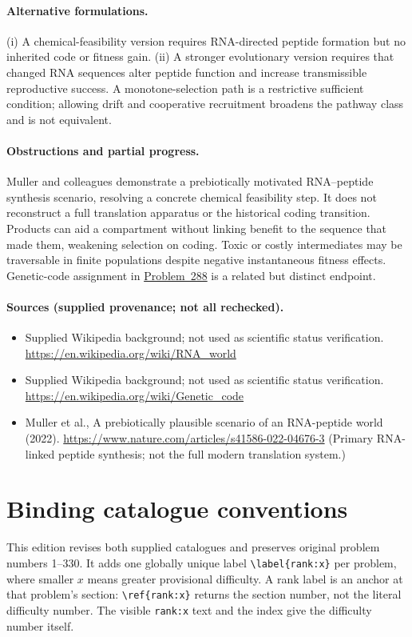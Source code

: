 \documentclass[11pt]{article}
\begin{document}
\paragraph{Alternative formulations.} (i) A chemical-feasibility version requires RNA-directed peptide formation but no inherited code or fitness gain. (ii) A stronger evolutionary version requires that changed RNA sequences alter peptide function and increase transmissible reproductive success. A monotone-selection path is a restrictive sufficient condition; allowing drift and cooperative recruitment broadens the pathway class and is not equivalent.

\paragraph{Obstructions and partial progress.} Muller and colleagues demonstrate a prebiotically motivated RNA--peptide synthesis scenario, resolving a concrete chemical feasibility step. It does not reconstruct a full translation apparatus or the historical coding transition. Products can aid a compartment without linking benefit to the sequence that made them, weakening selection on coding. Toxic or costly intermediates may be traversable in finite populations despite negative instantaneous fitness effects. Genetic-code assignment in \href{https://we-solve.github.io/problems/origin-of-the-genetic-code-6b6e4991/}{Problem~288} is a related but distinct endpoint.

\paragraph{Sources (supplied provenance; not all rechecked).} \begin{itemize}
\item Supplied Wikipedia background; not used as scientific status verification. \url{https://en.wikipedia.org/wiki/RNA_world}
\item Supplied Wikipedia background; not used as scientific status verification. \url{https://en.wikipedia.org/wiki/Genetic_code}
\item Muller et al., A prebiotically plausible scenario of an RNA-peptide world (2022). \url{https://www.nature.com/articles/s41586-022-04676-3} (Primary RNA-linked peptide synthesis; not the full modern translation system.)
\end{itemize}


\section*{Binding catalogue conventions}
This edition revises both supplied catalogues and preserves original problem numbers 1--330. It adds one globally unique label \verb|\label{rank:x}| per problem, where smaller $x$ means greater provisional difficulty. A rank label is an anchor at that problem's section: \verb|\ref{rank:x}| returns the section number, not the literal difficulty number. The visible \texttt{rank:x} text and the index give the difficulty number itself.
\end{document}
